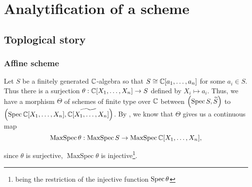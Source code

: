 
\chapter{Analytification of a scheme}


\section{Toplogical story}


\subsection{Affine scheme}



Let $S$ be a finitely generated $\mathbb{C}$-algebra so that $S \cong \mathbb{C}[a_{1},\dots, a_{n}]$ for some $a_{i} \in S$. Thus there is a surjection $\theta: \mathbb{C}[X_{1}, \dots, X_{n}] \to S$ defined by $X_{i} \mapsto a_{i}$. Thus, we have a morphism $\Theta$ of schemes of finite type over $\mathbb{C}$ between $\left(\operatorname*{Spec}{S}, \widetilde{S}\right)$ to $\left(\operatorname*{Spec}{\mathbb{C}[X_{1},\dots, X_{n}]}, \widetilde{\mathbb{C}[X_{1},\dots, X_{n}]}\right)$. By , we know that $\Theta$ gives us a continuous map
\[
\operatorname{MaxSpec}\theta: \operatorname{MaxSpec} S \to \operatorname{MaxSpec} \mathbb{C}[X_{1},\dots, X_{n}],
\]

since $\theta$ is surjective, $\operatorname{MaxSpec}\theta$ is injective\footnote{being the restriction of the injective function $\operatorname{Spec} \theta$}.

